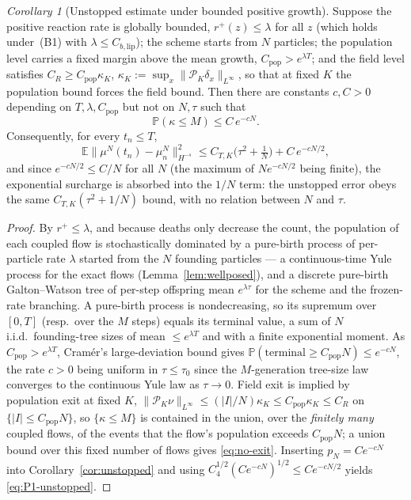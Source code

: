 \documentclass[a4paper,fleqn]{cas-sc}
\theoremstyle{definition}
\theoremstyle{remark}
\newtheorem{corollary}{Corollary}
\begin{document}
\begin{corollary}[Unstopped estimate under bounded positive growth]\label{cor:no-exit}
Suppose the positive reaction rate is globally bounded, $r^+(z)\le\lambda$ for all $z$ (which holds
under~(B1) with $\lambda\le C_{b,\mathrm{lip}}$); the scheme starts from $N$ particles; the population
level carries a fixed margin above the mean growth, $C_{\mathrm{pop}}>e^{\lambda T}$; and the field
level satisfies $C_R\ge C_{\mathrm{pop}}\kappa_K$, $\kappa_K:=\sup_x\|\mathcal P_K\delta_x\|_{L^\infty}$,
so that at fixed $K$ the population bound forces the field bound. Then there are constants $c,C>0$
depending on $T,\lambda,C_{\mathrm{pop}}$ but not on $N,\tau$ such that
\begin{equation}\label{eq:no-exit}
\mathbb P(\kappa\le M)\le C\,e^{-cN}.
\end{equation}
Consequently, for every $t_n\le T$,
\begin{equation}\label{eq:P1-unstopped}
\mathbb E\big\|\mu^N(t_n)-\mu^N_n\big\|_{H^{-s}}^2
\le C_{T,K}\Big(\tau^2+\tfrac1N\Big)+C\,e^{-cN/2},
\end{equation}
and since $e^{-cN/2}\le C/N$ for all $N$ (the maximum of $Ne^{-cN/2}$ being finite), the exponential
surcharge is absorbed into the $1/N$ term: the unstopped error obeys the same $C_{T,K}(\tau^2+1/N)$
bound, with no relation between $N$ and $\tau$.
\end{corollary}

\begin{proof}
By $r^+\le\lambda$, and because deaths only decrease the count, the population of each coupled flow is
stochastically dominated by a pure-birth process of per-particle rate $\lambda$ started from the $N$
founding particles --- a continuous-time Yule process for the exact flows (Lemma~\ref{lem:wellposed}),
and a discrete pure-birth Galton--Watson tree of per-step offspring mean $e^{\lambda\tau}$ for the
scheme and the frozen-rate branching. A pure-birth process is nondecreasing, so its supremum over
$[0,T]$ (resp.\ over the $M$ steps) equals its terminal value, a sum of $N$ i.i.d.\ founding-tree sizes
of mean $\le e^{\lambda T}$ and with a finite exponential moment. As $C_{\mathrm{pop}}>e^{\lambda T}$,
Cram\'er's large-deviation bound gives $\mathbb P(\text{terminal}\ge C_{\mathrm{pop}}N)\le e^{-cN}$,
the rate $c>0$ being uniform in $\tau\le\tau_0$ since the $M$-generation tree-size law converges to the
continuous Yule law as $\tau\to0$. Field exit is implied by population exit at fixed $K$,
$\|\mathcal P_K\nu\|_{L^\infty}\le(|I|/N)\kappa_K\le C_{\mathrm{pop}}\kappa_K\le C_R$ on
$\{|I|\le C_{\mathrm{pop}}N\}$, so $\{\kappa\le M\}$ is contained in the union, over the \emph{finitely
many} coupled flows, of the events that the flow's population exceeds $C_{\mathrm{pop}}N$; a union
bound over this fixed number of flows gives \eqref{eq:no-exit}. Inserting $p_N=Ce^{-cN}$ into
Corollary~\ref{cor:unstopped} and using $C_4^{1/2}(Ce^{-cN})^{1/2}\le Ce^{-cN/2}$ yields
\eqref{eq:P1-unstopped}.
\end{proof}
\end{document}

